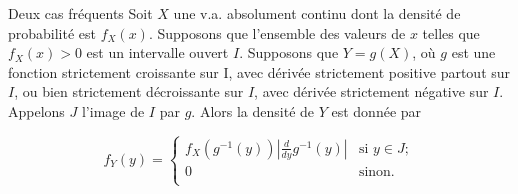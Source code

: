 \documentclass[nuit,charter,pied]{BeamerJS}
\begin{document}
\begin{frame}{Deux cas fréquents}
	Soit $X$ une v.a. absolument continu dont la densité de probabilité est $f_X(x)$. Supposons que l'ensemble des valeurs de $x$ telles que $f_X(x)>0$ est un intervalle ouvert $I$. Supposons que $Y=g(X)$, où $g$ est une fonction strictement croissante sur I, avec dérivée strictement positive partout sur $I$, ou bien strictement décroissante sur $I$, avec dérivée strictement négative sur $I$. Appelons $J$ l'image de $I$ par $g$. Alors la densité de $Y$ est donnée par

	\[f_Y(y)=\begin{cases}f_X\left(g^{-1}(y)\right)\left|\frac{d}{dy}g^{-1}(y)\right|&\text{si~} y\in J;\\
		0 &\text{sinon}.\\
	\end{cases}\]
\end{frame}
\end{document}
